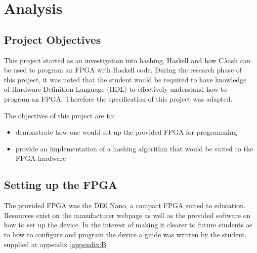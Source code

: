 \chapter{Analysis}
\section{Project Objectives}
This project started as an investigation into hashing, Haskell and how C$\lambda$ash can be used to program an FPGA with Haskell code. During the research phase of this project, it was noted that the student would be required to have knowledge of Hardware Definition Language (HDL) to effectively understand how to program an FPGA. Therefore the specification of this project was adapted.

The objectives of this project are to:
\begin{itemize}
	\item demonstrate how one would set-up the provided FPGA for programming
	\item provide an implementation of a hashing algorithm that would be suited to the FPGA hardware
\end{itemize}

\section{Setting up the FPGA }
The provided FPGA was the DE0 Nano\cite{DE0NanoWebpage}, a compact FPGA suited to education. Resources exist on the manufacturer webpage as well as the provided software on how to set up the device. In the interest of making it clearer to future students as to how to configure and program the device a guide was written by the student, supplied at appendix \ref{appendix:B}